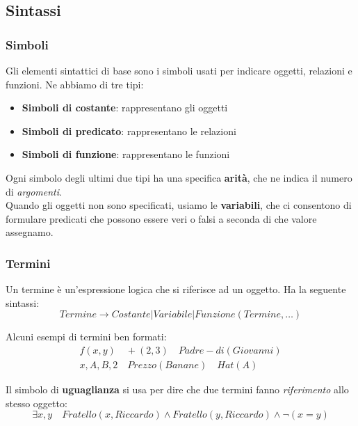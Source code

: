 \subsection{Sintassi}
\subsubsection{Simboli}
Gli elementi sintattici di base sono i simboli usati per indicare oggetti, relazioni e funzioni. Ne abbiamo di tre tipi:
\begin{itemize}
	\item \textbf{Simboli di costante}: rappresentano gli oggetti
	\item \textbf{Simboli di predicato}: rappresentano le relazioni
	\item \textbf{Simboli di funzione}: rappresentano le funzioni
\end{itemize}
Ogni simbolo degli ultimi due tipi ha una specifica \textbf{arità}, che ne indica il numero di \textit{argomenti}.\\
Quando gli oggetti non sono specificati, usiamo le \textbf{variabili}, che ci consentono di formulare predicati che possono essere veri o falsi a seconda di che valore assegnamo.

\subsubsection{Termini}
Un termine è un'espressione logica che si riferisce ad un oggetto. Ha la seguente sintassi:
\begin{equation*}
	Termine \to Costante \vert Variabile \vert Funzione(Termine, \ldots)
\end{equation*}
\begin{example}
	Alcuni esempi di termini ben formati:
	\begin{gather*}
		f(x,y) \quad +(2,3) \quad Padre-di(Giovanni) \\
		x,A,B,2 \quad Prezzo(Banane) \quad Hat(A)
	\end{gather*}
\end{example}

Il simbolo di \textbf{uguaglianza} si usa per dire che due termini fanno \textit{riferimento} allo stesso oggetto:
\begin{equation*}
	\exists x,y \quad Fratello(x, Riccardo)\land Fratello(y, Riccardo) \land \neg (x=y)
\end{equation*}

